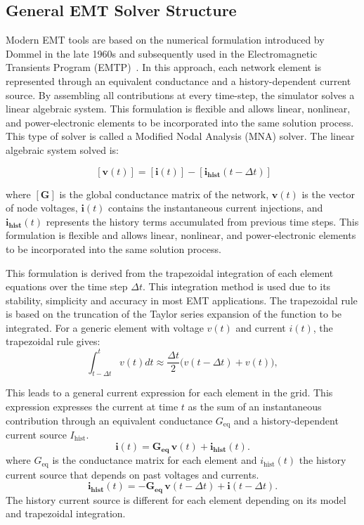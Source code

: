 \subsection{General EMT Solver Structure}
Modern EMT tools are based on the numerical formulation introduced by Dommel 
in the late 1960s and subsequently used in the Electromagnetic Transients Program (EMTP)~\cite{Dommel_EMTP_Theory_Book_1986}.
In this approach, each network element is represented through an equivalent conductance and a history-dependent 
current source. By assembling all contributions at every time-step, the simulator solves a linear algebraic 
system. This formulation is flexible and allows linear, nonlinear, 
and power-electronic elements to be incorporated into the same solution process. This type of solver is called a 
Modified Nodal Analysis (MNA) solver. The linear algebraic system solved is:

\begin{equation}
    [\bm{G}]~[\bm{v}(t)] = [\bm{i}(t)]-[\bm{i_{\text{hist}}}(t-\Delta t)]
\end{equation}

where $[\bm{G}]$ is the global conductance matrix of the network, $\bm{v}(t)$ is the vector of node voltages, 
$\bm{i}(t)$ contains the instantaneous current injections, and $\bm{i_{\text{hist}}}(t)$ represents the history terms 
accumulated from previous time steps. This formulation is flexible and allows linear, nonlinear, 
and power-electronic elements to be incorporated into the same solution process.

This formulation is derived from the trapezoidal integration of each element equations over the time step $\Delta t$. This integration method is used due to its stability, simplicity and accuracy in most EMT applications. 
The trapezoidal rule is based on the truncation of the Taylor series expansion of the function to be integrated.  
For a generic element with voltage $v(t)$ and current $i(t)$, the trapezoidal rule gives:
\begin{equation}
    \int_{t-\Delta t}^{t} v(t) dt \approx \frac{\Delta t}{2} \big( v(t-\Delta t) + v(t) \big),
\end{equation}

This leads to a general current expression for each element in the grid. This expression expresses the current at time $t$ as the 
sum of an instantaneous contribution through an equivalent conductance $G_{\text{eq}}$ and a history-dependent current source $I_{\text{hist}}$.
\begin{equation}
    \bm{i}(t) = \bm{G_{\text{eq}}} \, \bm{v}(t) + \bm{i_{\text{hist}}}(t).
\end{equation}
where $G_{\text{eq}}$ is the conductance matrix for each element and $i_{\text{hist}}(t)$ the history current source that depends on past voltages and currents.
\begin{equation}
    \bm{i_{\text{hist}}}(t) = -\bm{G_{\text{eq}}} \, \bm{v}(t-\Delta t) + \bm{i}(t-\Delta t).
\end{equation}
The history current source is different for each element depending on its model and trapezoidal integration.

